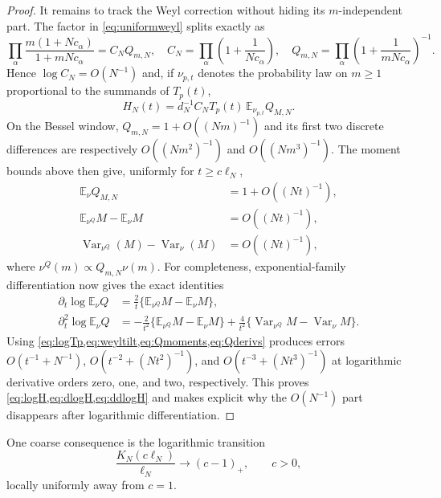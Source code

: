 \documentclass[11pt]{article}
\newcommand{\E}{\mathbb E}
\begin{document}
\begin{proof}
It remains to track the Weyl correction without hiding its $m$-independent
part.  The factor in \cref{eq:uniformweyl} splits exactly as
\begin{equation}
 \prod_{\alpha}\frac{m(1+Nc_\alpha)}{1+mNc_\alpha}
 =C_NQ_{m,N},\quad
 C_N=\prod_\alpha\left(1+\frac1{Nc_\alpha}\right),\quad
 Q_{m,N}=\prod_\alpha\left(1+\frac1{mNc_\alpha}\right)^{-1}. \label{eq:weylsplit}
\end{equation}
Hence $\log C_N=O(N^{-1})$ and, if $\nu_{p,t}$ denotes the probability law
on $m\ge1$ proportional to the summands of $T_p(t)$,
\begin{equation}
 H_N(t)=d_N^{-1}C_NT_p(t)\,\E_{\nu_{p,t}}Q_{M,N}.       \label{eq:weyltilt}
\end{equation}
On the Bessel window, $Q_{m,N}=1+O((Nm)^{-1})$ and its first two discrete
differences are respectively $O((Nm^2)^{-1})$ and $O((Nm^3)^{-1})$.
The moment bounds above then give, uniformly for $t\ge c\ell_N$,
\begin{align}
 \E_\nu Q_{M,N}&=1+O((Nt)^{-1}),\nonumber\\
 \E_{\nu^Q}M-\E_\nu M&=O((Nt)^{-1}),\nonumber\\
 \operatorname{Var}_{\nu^Q}(M)-\operatorname{Var}_\nu(M)
 &=O((Nt)^{-1}),                                        \label{eq:Qmoments}
\end{align}
where $\nu^Q(m)\propto Q_{m,N}\nu(m)$.  For completeness, exponential-family
differentiation now gives the exact identities
\begin{align}
 \partial_t\log\E_\nu Q
 &=\frac2t\{\E_{\nu^Q}M-\E_\nu M\},\nonumber\\
 \partial_t^2\log\E_\nu Q
 &=-\frac2{t^2}\{\E_{\nu^Q}M-\E_\nu M\}
   +\frac4{t^2}\{\operatorname{Var}_{\nu^Q}M-
                    \operatorname{Var}_\nu M\}.        \label{eq:Qderivs}
\end{align}
Using \cref{eq:logTp,eq:weyltilt,eq:Qmoments,eq:Qderivs} produces errors
$O(t^{-1}+N^{-1})$, $O(t^{-2}+(Nt^2)^{-1})$, and
$O(t^{-3}+(Nt^3)^{-1})$ at logarithmic derivative orders zero, one, and two,
respectively.  This proves \cref{eq:logH,eq:dlogH,eq:ddlogH} and makes
explicit why the $O(N^{-1})$ part disappears after logarithmic
differentiation.
\end{proof}

One coarse consequence is the logarithmic transition
\[
 \frac{K_N(c\ell_N)}{\ell_N}\longrightarrow(c-1)_+,
 \qquad c>0,                                             \label{eq:coarseK}
\]
locally uniformly away from $c=1$.
\end{document}
